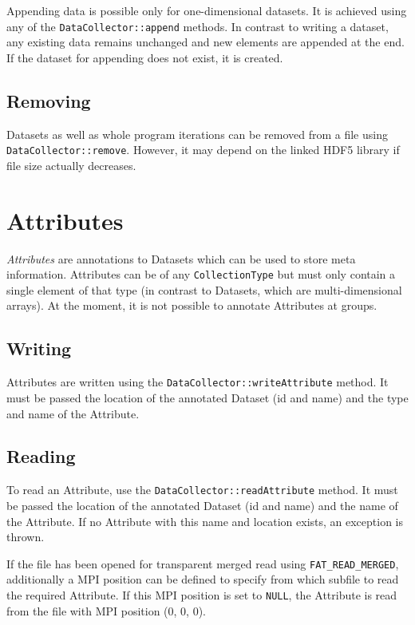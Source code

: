 \documentclass[a4paper,10pt,BCOR12mm]{report}
\begin{document}
Appending data is possible only for one-dimensional datasets.
It is achieved using any of the \texttt{DataCollector::append} methods.
In contrast to writing a dataset, any existing data remains unchanged and
new elements are appended at the end.
If the dataset for appending does not exist, it is created.

\subsection{Removing}

Datasets as well as whole program iterations can be removed from a file using\\ \texttt{DataCollector::remove}.
However, it may depend on the linked HDF5 library if file size actually decreases.


\section{Attributes}

\emph{Attributes} are annotations to Datasets which can be used to store meta information.
Attributes can be of any \texttt{CollectionType} but must only contain a single element
of that type (in contrast to Datasets, which are multi-dimensional arrays).
At the moment, it is not possible to annotate Attributes at groups.

\subsection{Writing}

Attributes are written using the \texttt{DataCollector::writeAttribute} method.
It must be passed the location of the annotated Dataset (id and name) and the type and
name of the Attribute.

\subsection{Reading}

To read an Attribute, use the \texttt{DataCollector::readAttribute} method.
It must be passed the location of the annotated Dataset (id and name) and the
name of the Attribute. If no Attribute with this name and location exists, an
exception is thrown.

If the file has been opened for transparent merged read using \texttt{FAT\_READ\_MERGED},
additionally a MPI position can be defined to specify from which subfile to read
the required Attribute.
If this MPI position is set to \texttt{NULL}, the Attribute is read from the file with
MPI position (0, 0, 0).
\end{document}
